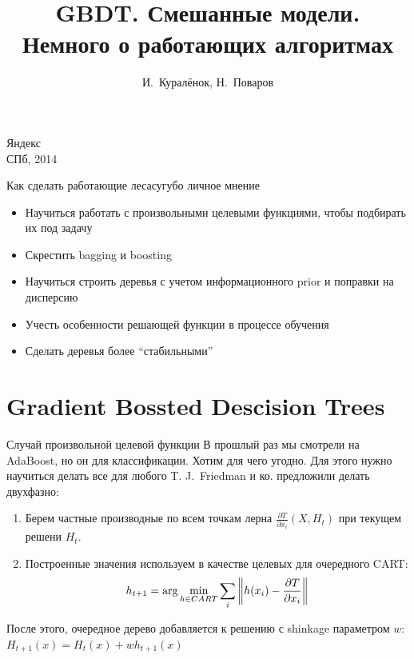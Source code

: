 \documentclass[14pt, fleqn, xcolor={dvipsnames, table}]{beamer}
\title{GBDT. Смешанные модели. \\\small{Немного о работающих алгоритмах}}
\author[]{\small{%
И.~Куралёнок,
Н.~Поваров}}
\date{}
\begin{document}
\begin{frame}
\maketitle
\small
\begin{center}
\vspace{-60pt}
\normalsize {\color{red}Я}ндекс \\
\vspace{80pt}
\footnotesize СПб, 2014
\end{center}
\end{frame}

\begin{frame}{Как сделать работающие леса}{сугубо личное мнение}
\begin{itemize}
  \item Научиться работать с произвольными целевыми функциями, чтобы подбирать их под задачу
  \item Скрестить bagging и boosting
  \item Научиться строить деревья с учетом информационного prior и поправки на дисперсию
  \item Учесть особенности решающей функции в процессе обучения
  \item Сделать деревья более ``стабильными''
\end{itemize}
\end{frame}

\section{Gradient Bossted Descision Trees}
\small
\begin{frame}{Случай произвольной целевой функции}
В прошлый раз мы смотрели на AdaBoost, но он для классификации. Хотим для чего угодно. Для этого нужно научиться делать все для любого T. J.~Friedman и ко. предложили делать двухфазно:
\begin{enumerate}
  \item Берем частные производные по всем точкам лерна  $\frac{\partial T}{\partial x_i}\left(X,H_t\right)$ при текущем решени $H_t$.
  \item Построенные значения используем в качестве целевых для очередного CART:
  $$
  h_{t+1} = \arg \min_{h \in CART} \sum_i \left\|h(x_i) - {\partial T \over \partial x_i}\right\|
  $$
\end{enumerate}
После этого, очередное дерево добавляется к решению с shinkage параметром $w$: $H_{t+1}(x) = H_t(x) + w h_{t+1}(x)$
\end{frame}
\end{document}
